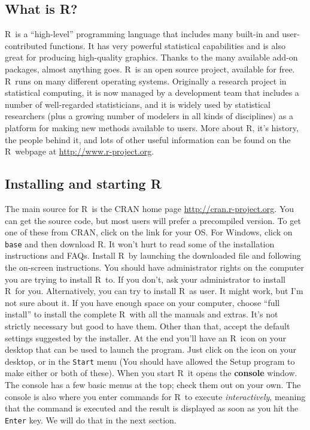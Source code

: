 \documentclass [11pt]{article}
\newcommand{\code}[1]{{\tt #1}}
\newcommand\R{{\sf R}}
\numberwithin{exercise}{section}
\begin{document}
\subsection{What is \R?}
\R\ is a ``high-level'' programming language that includes many built-in and user-contributed functions. It has very powerful statistical capabilities and is also great for producing high-quality graphics. Thanks to the many available add-on packages, almost anything goes. \R\ is an open source project, available for free. \R\ runs on many different operating systems. Originally a research project in statistical computing, it is now managed by a development team that includes a number of well-regarded statisticians, and it is widely used by statistical researchers (plus a growing number of modelers in all kinds of disciplines) as a platform for making new methods available to users. More about \R, it's history, the people behind it, and lots of other useful information can be found on the \R\ webpage at \url{http://www.r-project.org}.

\subsection{Installing and starting \R}
The main source for \R\ is the CRAN home page \url{http://cran.r-project.org}. You
can get the source code, but most users will prefer a precompiled 
version. To get one of these from CRAN, click on the link for your OS. For Windows, click on \code{base} and then download \R. 
It won't hurt to read some of the installation instructions and FAQs. Install \R\ by launching the downloaded file and 
following the on-screen instructions. You should have administrator rights on the computer you are trying to install \R\ to. If you don't, ask your administrator to install \R\ for you. Alternatively, you can try to install \R\ as user. It might work, but I'm not sure about it. If you have enough space on your computer, choose ``full install'' to install the complete \R\ with all the manuals and extras. It's not strictly necessary but good to have them. Other than that, accept the default settings suggested by the installer.
At the end you'll have an \R\ icon on your desktop that can be used to launch the program. Just click on the icon on your desktop, or in the \code{Start}
menu (You should have allowed the Setup program to make either or both of these). When you start \R\ it opens the \textbf{console} window. The console has a few basic menus at the top; check them out on your own. The console is also where you enter commands for \R\ to execute \emph{interactively}, meaning that the command is executed and 
the result is displayed as soon as you hit the \code{Enter} key. We will do that in the next section.
\end{document}
